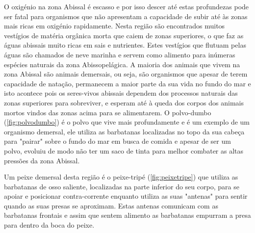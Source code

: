 \documentclass{report}
\begin{document}
O oxigénio na zona Abissal é escasso e por isso descer até estas profundezas pode ser fatal para organismos que não apresentam a capacidade de subir até às zonas mais ricas em oxigénio rapidamente. Nesta região são encontrados muitos vestígios de matéria orgânica morta que caiem de zonas superiores, o que faz as águas abissais muito ricas em sais e nutrientes. Estes vestígios que flutuam pelas águas são chamados de neve marinha e servem como alimento para inúmeras espécies naturais da zona Abissopelágica. 
A maioria dos animais que vivem na zona Abissal são animais demersais, ou seja, são organismos que apesar de terem capacidade de natação, permanecem a maior parte da sua vida no fundo do mar e isto acontece pois os seres-vivos abissais dependem dos processos naturais das zonas superiores para sobreviver, e esperam até à queda dos corpos dos animais mortos vindos das zonas acima para se alimentarem.
O polvo-dumbo (\ref{fig:polvodumbo}) é o polvo que vive mais profundamente e é um exemplo de um organismo demersal, ele utiliza as barbatanas localizadas no topo da sua cabeça para "pairar"  sobre o fundo do mar em busca de comida e apesar de ser um polvo, evoluiu de modo não ter um saco de tinta para melhor combater as altas pressões da zona Abissal.

Um peixe demersal desta região é o peixe-tripé (\ref{fig:peixetripe}) que utiliza as barbatanas de osso saliente, localizadas na parte inferior do seu corpo, para se apoiar e posicionar contra-corrente enquanto utiliza as suas "antenas" para sentir quando as suas presas se aproximam. Estas antenas comunicam com as barbatanas frontais e assim que sentem alimento as barbatanas empurram a presa para dentro da boca do peixe.
\end{document}
